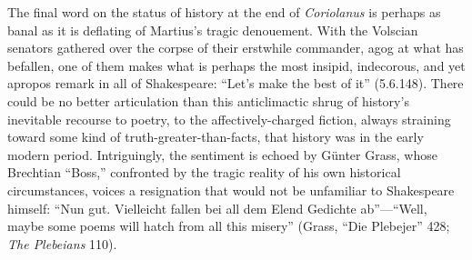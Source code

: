 The final word on the status of history at the end of \emph{Coriolanus} is perhaps as banal as it is deflating of Martius's tragic denouement.
With the Volscian senators gathered over the corpse of their erstwhile commander, agog at what has befallen, one of them makes what is perhaps the most insipid, indecorous, and yet apropos remark in all of Shakespeare: ``Let's make the best of it'' (5.6.148).
There could be no better articulation than this anticlimactic shrug of history's inevitable recourse to poetry, to the affectively-charged fiction, always straining toward some kind of truth-greater-than-facts, that history was in the early modern period.
Intriguingly, the sentiment is echoed by Günter Grass, whose Brechtian ``Boss,'' confronted by the tragic reality of his own historical circumstances, voices a resignation that would not be unfamiliar to Shakespeare himself: 
``Nun gut. Vielleicht fallen bei all dem Elend Gedichte ab''---``Well, maybe some poems will hatch from all this misery'' (Grass, ``Die Plebejer'' 428; \emph{The Plebeians} 110).
